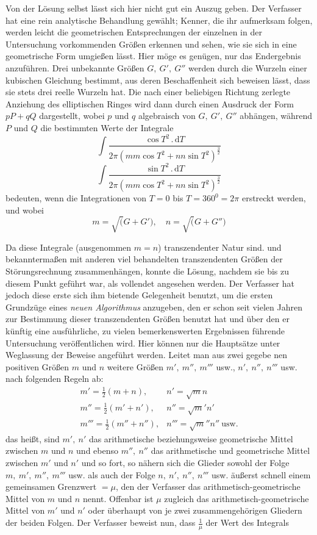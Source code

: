 Von der Lösung selbst lässt sich hier nicht gut ein Auszug geben. Der Verfasser hat eine rein analytische Behandlung gewählt; Kenner, die ihr aufmerksam folgen, werden leicht die geometrischen Entsprechungen der einzelnen in der Untersuchung vorkommenden Größen erkennen und sehen, wie sie sich in eine geometrische Form umgießen lässt. Hier möge es genügen, nur das Endergebnis anzuführen. Drei unbekannte Größen $G,\ G',\ G''$ werden durch die Wurzeln einer kubischen Gleichung bestimmt, aus deren Beschaffenheit sich beweisen lässt, dass sie stets drei reelle Wurzeln hat. Die nach einer beliebigen Richtung zerlegte Anziehung des elliptischen Ringes wird dann durch einen Ausdruck der Form $pP+qQ$ dargestellt, wobei $p$ und $q$ algebraisch von $G,\ G',\ G''$ abhängen, während $P$ und $Q$ die bestimmten Werte der Integrale
\[
\int\frac{\cos T^{2}\,.\,\mathrm{d}T}
{2\pi(mm\cos T^{2}+nn\sin T^{2})^{\frac{3}{2}}}
\]
\[
\int\frac{\sin T^{2}\,.\,\mathrm{d}T}
{2\pi(mm\cos T^{2}+nn\sin T^{2})^{\frac{3}{2}}}
\]
bedeuten, wenn die Integrationen von $T=0$ bis $T=360^{0}=2\pi$ erstreckt werden, und wobei
\[
m=\surd(G+G'),\quad n=\surd(G+G'')
\]
\par Da diese Integrale (ausgenommen $m=n$) transzendenter Natur sind. und bekanntermaßen mit anderen viel behandelten transzendenten Größen der Störungsrechnung zusammenhängen, konnte die Lösung, nachdem sie bis zu diesem Punkt geführt war, als vollendet angesehen werden. Der Verfasser hat jedoch diese erste sich ihm bietende Gelegenheit benutzt, um die ersten Grundzüge eines \textit{neuen Algorithmus} anzugeben, den er schon seit vielen Jahren zur Bestimmung dieser transzendenten Größen benutzt hat und über den er künftig eine ausführliche, zu vielen bemerkenswerten Ergebnissen führende Untersuchung veröffentlichen wird. Hier können nur die Hauptsätze unter Weglassung der Beweise angeführt werden. Leitet man aus zwei gegebe%
nen positiven Größen $m$ und $n$ weitere Größen $m',\ m'',\ m'''$ usw., $n',\ n'',\ n'''$ usw. nach folgenden Regeln ab:
\[
\begin{array}{ll}
m'=\frac{1}{2}(m+n),&n'=\surd mn\\[0.4em]
m''=\frac{1}{2}(m'+n'),&n''=\surd m'n'\\[0.4em]
m'''=\frac{1}{2}(m''+n''),&n'''=\surd m''n''\ \mbox{usw.}
\end{array}
\]
das heißt, sind $m',\ n'$ das arithmetische beziehungsweise geometrische Mittel zwischen $m$ und $n$ und ebenso $m'',\ n''$ das arithmetische und geometrische Mittel zwischen $m'$ und $n'$ und so fort, so nähern sich die Glieder sowohl der Folge $m,\ m',\ m'',\ m'''$ usw. als auch der Folge $n,\ n',\ n'',\ n'''$ usw. äußerst schnell einem gemeinsamen Grenzwert $=\mu$, den der Verfasser das arithmetisch-geometrische Mittel von $m$ und $n$ nennt. Offenbar ist $\mu$ zugleich das arithmetisch-geometrische Mittel von $m'$ und $n'$ oder überhaupt von je zwei zusammengehörigen Gliedern der beiden Folgen. Der Verfasser beweist nun, dass $\frac{1}{\mu}$ der Wert des Integrals
